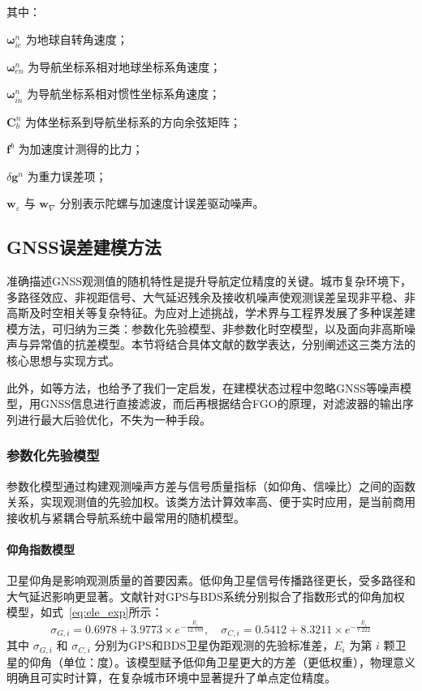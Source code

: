 其中：

$\boldsymbol{\omega}_{ie}^n$
为地球自转角速度；

$\boldsymbol{\omega}_{en}^n$
为导航坐标系相对地球坐标系角速度；

$\boldsymbol{\omega}_{in}^n$
为导航坐标系相对惯性坐标系角速度；

$\mathbf{C}_b^n$
为体坐标系到导航坐标系的方向余弦矩阵；

$\mathbf{f}^b$
为加速度计测得的比力；

$\delta \mathbf{g}^n$
为重力误差项；

$\mathbf{w}_{\varepsilon}$ 与
$\mathbf{w}_{\nabla}$
分别表示陀螺与加速度计误差驱动噪声。

\subsection{GNSS误差建模方法}

准确描述GNSS观测值的随机特性是提升导航定位精度的关键。城市复杂环境下，多路径效应、非视距信号、大气延迟残余及接收机噪声使观测误差呈现非平稳、非高斯及时空相关等复杂特征。为应对上述挑战，学术界与工程界发展了多种误差建模方法，可归纳为三类：参数化先验模型、非参数化时空模型，以及面向非高斯噪声与异常值的抗差模型。本节将结合具体文献的数学表达，分别阐述这三类方法的核心思想与实现方式。

此外，如\cite{electronics14040660}等方法，也给予了我们一定启发，在建模状态过程中忽略GNSS等噪声模型，用GNSS信息进行直接滤波，而后再根据结合FGO的原理，对滤波器的输出序列进行最大后验优化，不失为一种手段。

\subsubsection{参数化先验模型}
参数化模型通过构建观测噪声方差与信号质量指标（如仰角、信噪比）之间的函数关系，实现观测值的先验加权。该类方法计算效率高、便于实时应用，是当前商用接收机与紧耦合导航系统中最常用的随机模型。

\paragraph{仰角指数模型}
卫星仰角是影响观测质量的首要因素。低仰角卫星信号传播路径更长，受多路径和大气延迟影响更显著。文献\cite{xie2025adaptive}针对GPS与BDS系统分别拟合了指数形式的仰角加权模型，如式~\ref{eq:ele_exp}所示：
\begin{equation}
\sigma_{G,i} = 0.6978 + 3.9773 \times e^{-\frac{E_i}{12.789}}, \quad
\sigma_{C,i} = 0.5412 + 8.3211 \times e^{-\frac{E_i}{7.222}}
\label{eq:ele_exp}
\end{equation}
其中 $\sigma_{G,i}$ 和 $\sigma_{C,i}$ 分别为GPS和BDS卫星伪距观测的先验标准差，$E_i$ 为第 $i$ 颗卫星的仰角（单位：度）。该模型赋予低仰角卫星更大的方差（更低权重），物理意义明确且可实时计算，在复杂城市环境中显著提升了单点定位精度。

